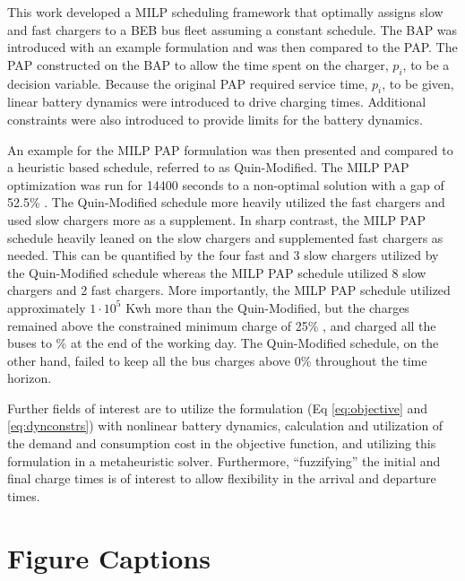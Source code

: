 \documentclass[utf8]{FrontiersinHarvard}
\newcommand{\bcharge}{0.7 }                                                     %
\newcommand{\mincharge}{25\% }                                                  %
\newcommand{\timeran}{14400 }                                                   %
\newcommand{\gappercent}{52.5\% }                                               %
\begin{document}
This work developed a MILP scheduling framework that optimally assigns slow and fast chargers to a BEB bus fleet
assuming a constant schedule. The BAP was introduced with an example formulation and was then compared to the PAP. The
PAP constructed on the BAP to allow the time spent on the charger, $p_i$, to be a decision variable. Because the
original PAP required service time, $p_i$, to be given, linear battery dynamics were introduced to drive charging times.
Additional constraints were also introduced to provide limits for the battery dynamics.

An example for the MILP PAP formulation was then presented and compared to a heuristic based schedule, referred to as
Quin-Modified. The MILP PAP optimization was run for \timeran seconds to a non-optimal solution with a gap of
\gappercent. The Quin-Modified schedule more heavily utilized the fast chargers and used slow chargers more as a
supplement. In sharp contrast, the MILP PAP schedule heavily leaned on the slow chargers and supplemented fast chargers
as needed. This can be quantified by the four fast and 3 slow chargers utilized by the Quin-Modified schedule whereas
the MILP PAP schedule utilized 8 slow chargers and 2 fast chargers. More importantly, the MILP PAP schedule utilized
approximately $1\cdot10^5$ Kwh more than the Quin-Modified, but the charges remained above the constrained minimum charge of
\mincharge, and charged all the buses to \fpeval{\bcharge *100}\% at the end of the working day. The Quin-Modified
schedule, on the other hand, failed to keep all the bus charges above 0\% throughout the time horizon.

Further fields of interest are to utilize the formulation (Eq \eqref{eq:objective} and \eqref{eq:dynconstrs}) with
nonlinear battery dynamics, calculation and utilization of the demand and consumption cost in the objective function,
and utilizing this formulation in a metaheuristic solver. Furthermore, ``fuzzifying'' the initial and final charge times
is of interest to allow flexibility in the arrival and departure times.

%




\newpage
\section*{Figure Captions}
\end{document}
